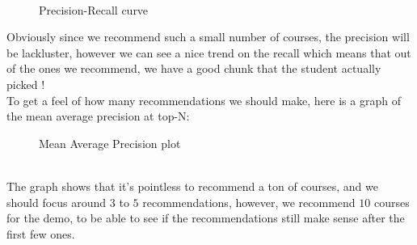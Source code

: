 \documentclass{article}
\begin{document}
\\\begin{figure}[h]
\centering
{}
  \caption{Precision-Recall curve}
  \label{fig:precrec}
\end{figure}

        \newpage
        Obviously since we recommend such a small number of courses, the precision will be lackluster, however we can see a nice trend on the recall which means that out of the ones we recommend, we have a good chunk that the student actually picked !
        \\To get a feel of how many recommendations we should make, here is a graph of the mean average precision at top-N:
\\\begin{figure}[h]
\centering
{}
  \caption{Mean Average Precision plot}
  \label{fig:mapatk}
\end{figure}
        \\The graph shows that it's pointless to recommend a ton of courses, and we should focus around $3$ to $5$ recommendations, however, we recommend $10$ courses for the demo, to be able to see if the recommendations still make sense after the first few ones.
\end{document}
